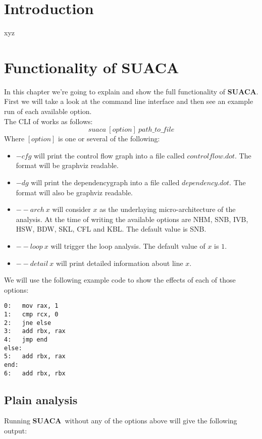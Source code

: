 \documentclass[a4paper,12pt,titlepage, twoside]{report}
\newcommand{\suaca}{\textbf{SUACA}}
\begin{document}
\newpage
\thispagestyle{empty}
\mbox{}

\setcounter{page}{0}
\tableofcontents 


\chapter{Introduction}
xyz

\chapter{Functionality of SUACA}
In this chapter we're going to explain and show the full functionality of \suaca. First we will take a look at the command line interface and then see an example run of each available option.\\
The CLI of works as follows:\\
\[
suaca\ [option]\ path\_to\_file
\]
Where $[option]$ is one or several of the following:
\begin{itemize}
    \item $-cfg$ will print the control flow graph into a file called $controlflow.dot$. The format will be graphviz readable.
    \item $-dg$ will print the dependencygraph into a file called $dependency.dot$. The format will also be graphviz readable.
    \item ${--}arch\ x$ will consider $x$ as the underlaying micro-architecture of the analysis. At the time of writing the available options are NHM, SNB, IVB, HSW, BDW, SKL, CFL and KBL. The default value is SNB.
    \item ${--}loop\ x$ will trigger the loop analysis. The default value of $x$ is $1$.
    \item ${--}detail\ x$ will print detailed information about line $x$.
\end{itemize}

We will use the following example code to show the effects of each of those options:

\begin{verbatim}
0:   mov rax, 1
1:   cmp rcx, 0
2:   jne else
3:   add rbx, rax
4:   jmp end
else:
5:   add rbx, rax
end:
6:   add rbx, rbx
\end{verbatim}

\section{Plain analysis}
Running \suaca\ without any of the options above will give the following output:
\end{document}
